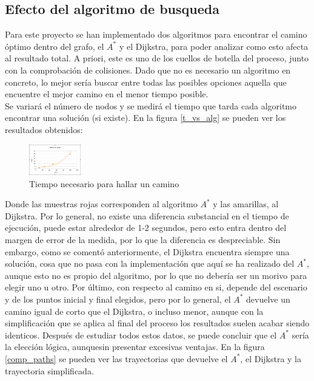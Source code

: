 \subsection{Efecto del algoritmo de busqueda}

Para este proyecto se han implementado dos algoritmos para encontrar el camino óptimo dentro del grafo, el $A^*$ y el Dijkstra, para poder analizar como esto afecta al resultado total. A priori, este es uno de los cuellos de botella del proceso, junto con la comprobación de colisiones. Dado que no es necesario un algoritmo en concreto, lo mejor sería buscar entre todas las posibles opciones aquella que encuentre el mejor camino en el menor tiempo posible.\\

Se variará el número de nodos y se medirá el tiempo que tarda cada algoritmo encontrar una solución (si existe). En la figura \ref{t_vs_alg} se pueden ver los resultados obtenidos:\\

\begin{figure}[H]
		\centering
        \includegraphics[width=0.2\textwidth]{images/t_vs_nodos_vs_alg.png}
        \caption{Tiempo necesario para hallar un camino}
        \label{fig:t_vs_alg}
\end{figure}

Donde las muestras rojas corresponden al algoritmo $A^*$ y las amarillas, al Dijkstra. Por lo general, no existe una diferencia substancial en el tiempo de ejecución, puede estar alrededor de 1-2 segundos, pero esto entra dentro del margen de error de la medida, por lo que la diferencia es despreciable. Sin embargo, como se comentó anteriormente, el Dijkstra encuentra siempre una solución, cosa que no pasa con la implementación que aquí se ha realizado del $A^*$, aunque esto no es propio del algoritmo, por lo que no debería ser un morivo para elegir uno u otro. Por último, con respecto al camino en si, depende del escenario y de los puntos inicial y final elegidos, pero por lo general, el $A^*$ devuelve un camino igual de corto que el Dijkstra, o incluso menor, aunque con la simplificación que se aplica al final del proceso los resultados suelen acabar siendo identicos. Después de estudiar todos estos datos, se puede concluir que el  $A^*$ sería la elección lógica, aunquesin presentar excesivas ventajas. En la figura \ref{comp_paths} se pueden ver las trayectorias que devuelve el  $A^*$, el Dijkstra y la trayectoria simplificada.\\

